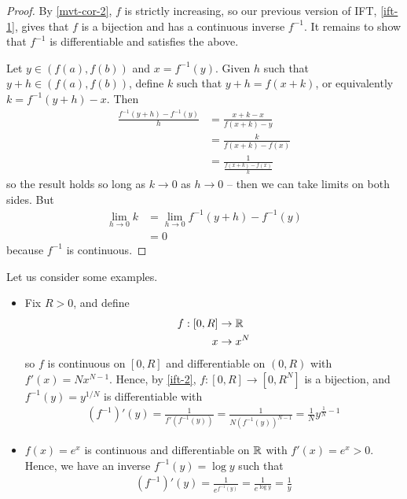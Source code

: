 \documentclass{../template/note}
\begin{document}
    \begin{proof}
        By \cref{mvt-cor-2}, \(f\) is strictly increasing, so our previous version of IFT, \cref{ift-1}, gives that \(f\) is a bijection and has a continuous inverse \(f^{-1}\). It remains to show that \(f^{-1}\) is differentiable and satisfies the above.

        Let \(y \in (f(a), f(b))\) and \(x = f^{-1}(y)\). Given \(h\) such that \(y + h \in (f(a), f(b))\), define \(k\) such that \(y+h=f(x+k)\), or equivalently \(k=f^{-1}(y+h)-x\). Then
        \begin{align*}
            \frac{f^{-1}(y+h)-f^{-1}(y)}{h} &= \frac{x+k-x}{f(x+k)-y} \\
            &= \frac{k}{f(x+k)-f(x)} \\
            &= \frac 1{\frac{f(x+k)-f(x)}{k}}
        \end{align*}
        so the result holds so long as \(k \to 0\) as \(h \to 0\) -- then we can take limits on both sides. But
        \begin{align*}
            \lim_{h \to 0} k &= \lim_{h \to 0} f^{-1}(y+h) - f^{-1}(y) \\
            &= 0
        \end{align*}
        because \(f^{-1}\) is continuous.       
    \end{proof}
    
    \begin{example}
        Let us consider some examples.
        \begin{itemize}
            \item Fix \(R > 0\), and define
            \begin{align*}
                f: [0, R] &\to \mathbb R \\
                x &\to x^N
            \end{align*}
            so \(f\) is continuous on \([0, R]\) and differentiable on \((0, R)\) with \(f'(x) = Nx^{N-1}\). Hence, by \cref{ift-2}, \(f: [0, R] \to [0, R^N]\) is a bijection, and \(f^{-1}(y) = y^{1/N}\) is differentiable with
            \begin{align*}
                (f^{-1})'(y) = \frac 1 {f'(f^{-1}(y))} = \frac 1 {N (f^{-1}(y))^{N-1}} = \frac 1 N y^{\frac 1 N - 1}
            \end{align*}
            \item \(f(x) = e^x\) is continuous and differentiable on \(\mathbb R\) with \(f'(x) = e^x > 0\). Hence, we have an inverse \(f^{-1}(y) = \log y\) such that
            \begin{align*}
                (f^{-1})'(y) = \frac 1 {e^{f^{-1}(y)}} = \frac 1 {e^{\log y}} = \frac 1 y
            \end{align*}
        \end{itemize}
    \end{example}
    
\end{document}
